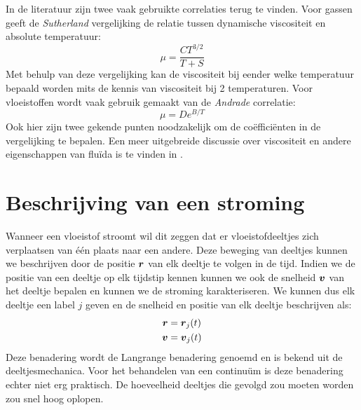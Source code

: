 In de literatuur zijn twee vaak gebruikte correlaties terug te vinden. Voor gassen geeft de \emph{Sutherland} vergelijking de relatie tussen dynamische viscositeit en absolute temperatuur:
\begin{equation}
	\mu = \frac{C T^{3/2}}{T+S}
\end{equation}
Met behulp van deze vergelijking kan de viscositeit bij eender welke temperatuur bepaald worden mits de kennis van viscositeit bij 2 temperaturen. Voor vloeistoffen wordt vaak gebruik gemaakt van de \emph{Andrade} correlatie:
\begin{equation}
	\mu = D e^{B/T}
\end{equation}
Ook hier zijn twee gekende punten noodzakelijk om de coëfficiënten in de vergelijking te bepalen. Een meer uitgebreide discussie over viscositeit en andere eigenschappen van fluïda is te vinden in \cite{Poling2001}.

	\section{Beschrijving van een stroming}
	\label{sec:Beschrijving van een stroming}
Wanneer een vloeistof stroomt wil dit zeggen dat er vloeistofdeeltjes zich verplaatsen van één plaats naar een andere. Deze beweging van deeltjes kunnen we beschrijven door de positie $\boldsymbol{r}$ van elk deeltje te volgen in de tijd. Indien we de positie van een deeltje op elk tijdstip kennen kunnen we ook de snelheid $\boldsymbol{v}$ van het deeltje bepalen en kunnen we de stroming karakteriseren. We kunnen dus elk deeltje een label $j$ geven en de snelheid en positie van elk deeltje beschrijven als:
\begin{align}
	\boldsymbol{r} &= \boldsymbol{r}_j(t) \\
	\boldsymbol{v} &= \boldsymbol{v}_j(t)
\end{align}
Deze benadering wordt de Langrange benadering genoemd en is bekend uit de deeltjesmechanica. Voor het behandelen van een continuüm is deze benadering echter niet erg praktisch. De hoeveelheid deeltjes die gevolgd zou moeten worden zou snel hoog oplopen.

